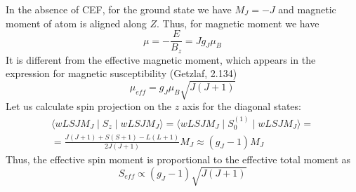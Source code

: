 \documentclass[a4paper,oneside,12pt]{extarticle}
\begin{document}
In the absence of CEF, for the ground state we have $M_J=-J$ and magnetic moment of atom is aligned along $Z$. Thus, for magnetic moment we have
%
\begin{equation}
	\mu = -\frac{E}{B_z} = J g_J \mu_B
\end{equation}
%
It is different from the effective magnetic moment, which appears in the expression for magnetic susceptibility (Getzlaf, 2.134)
%
\begin{equation}
	\mu_{eff} = g_J \mu_B \sqrt{J(J+1)}
\end{equation}
%
Let us calculate spin projection on the $z$ axis for the diagonal states:
%
\begin{multline}
\langle wLSJM_J \mid S_z \mid wLSJM_J \rangle =
\langle wLSJM_J \mid S_0^{(1)} \mid wLSJM_J \rangle =\\=
\frac{J(J+1)+S(S+1)-L(L+1)}{2J(J+1)} M_J \approx (g_J - 1) M_J
\end{multline}
%
Thus, the effective spin moment is proportional to the effective total moment as
\begin{equation}
S_{eff} \propto (g_J - 1) \sqrt{J(J+1)}
\label{eq:Seff}
\end{equation}
%
\end{document}
